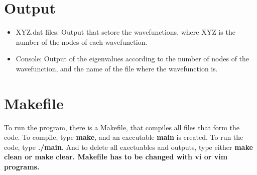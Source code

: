 \documentclass[a4paper,10pt]{article}
\begin{document}
\section{Output}
\begin{itemize}
 \item  XYZ.dat files: Output that setore the wavefunctions, where XYZ is the number of the nodes of each wavefunction.
 \item  Console: Output of the eigenvalues according to the number of nodes of the wavefunction, and the name of the file where the
 wavefunction is. 

\end{itemize}

\section{Makefile}
To run the program, there is a Makefile, that compiles all files that form the code. 
To compile, type \textbf{make}, and an executable \textbf{main} is created. To run the code, 
type \textbf{./main}. And to delete all exectuables and outputs, type either \bf{make clean} or
\textbf{make clear}. Makefile has to be changed with vi or vim programs.
\end{document}
